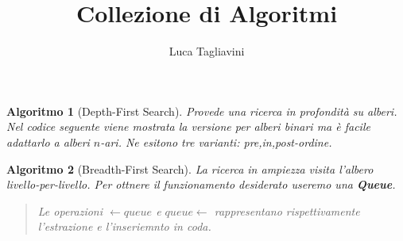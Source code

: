 \documentclass[oneside]{book}
\title{Collezione di Algoritmi}
\author{Luca Tagliavini}
\newtheorem{alg}{Algoritmo}
\begin{document}
\maketitle
\listoftheorems
\pagebreak

\begin{alg}[Depth-First Search]
  Provede una ricerca in profondit\`a su alberi. Nel codice seguente viene mostrata
  la versione per alberi binari ma \`e facile adattarlo a alberi $n$-ari.
  Ne esitono tre varianti: {\normalfont pre,in,post}-ordine.

  \begin{algorithm}[H]

  \end{algorithm}
\end{alg}

\begin{alg}[Breadth-First Search]
  La ricerca in ampiezza visita l'albero livello-per-livello. Per ottnere il
  funzionamento desiderato useremo una \textbf{Queue}.
  \begin{algorithm}[H]

  \end{algorithm}
  \begin{quote}
    \normalfont
    Le operazioni $\gets queue$ e $queue \gets$ rappresentano
    rispettivamente l'estrazione e l'inseriemnto in coda.
  \end{quote}
\end{alg}

\pagebreak
\end{document}
